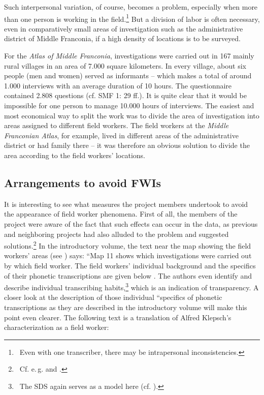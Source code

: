\documentclass[output=paper]{LSP/langsci}
\begin{document}
Such interpersonal variation, of course, becomes a problem, especially when more than one person is working in the field.\footnote{\ Even with one transcriber, there may be intrapersonal inconsistencies.} But a division of labor is often necessary, even in comparatively small areas of investigation such as the administrative district of Middle Franconia, if a high density of locations is to be surveyed.

For the \textit{Atlas of Middle Franconia}, investigations were carried out in 167 mainly rural villages in an area of 7.000 square kilometers. In every village, about six people (men and women) served as informants – which makes a total of around 1.000 interviews with an average duration of 10 hours. The questionnaire contained 2.808 questions (cf. SMF 1: 29 ff.). It is quite clear that it would be impossible for one person to manage 10.000 hours of interviews. The easiest and most economical way to split the work was to divide the area of investigation into areas assigned to different field workers. The field workers at the \textit{Middle Franconian Atlas}, for example, lived in different areas of the administrative district or had family there – it was therefore an obvious solution to divide the area according to the field workers' locations.

\subsection{Arrangements to avoid FWIs}
It is interesting to see what measures the project members undertook to avoid the appearance of field worker phenomena. First of all, the members of the project were aware of the fact that such effects can occur in the data, as previous and neighboring projects had also alluded to the problem and suggested solutions.\footnote{\ Cf. e.\,g. \citet[59]{hotzenkocherle_einfuhrung_1962} and \citet[45]{konig_sprachatlas_1997}.} In the introductory volume, the text near the map showing the field workers' areas (see ) says: ``Map 11 shows which investigations were carried out by which field worker. The field workers' individual background and the specifics of their phonetic transcriptions are given below{\textquotedbl} \citep[47]{klepsch_sprachatlas_2013}. The authors even identify and describe individual transcribing habits,\footnote{\ The SDS again serves as a model here (cf. \citealt[61--73]{hotzenkocherle_einfuhrung_1962}).} which is an indication of transparency. A closer look at the description of those individual ``specifics of phonetic transcriptions{\textquotedbl} as they are described in the introductory volume will make this point even clearer. The following text is a translation of Alfred Klepsch's characterization as a field worker:
\end{document}
